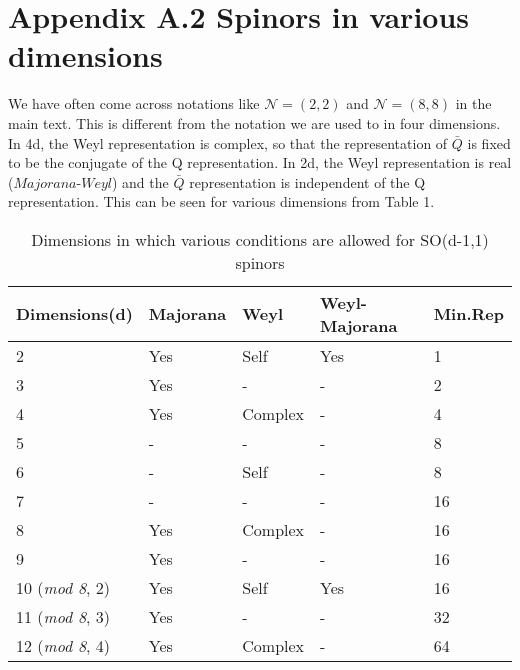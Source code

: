 \noindent \section*{\label{app:spinors} Appendix A.2 Spinors in various dimensions}


We have often come across notations like $\mathcal{N} = (2,2)$ and $\mathcal{N} = (8,8)$ in the main text. This is different from the notation we are used to in four dimensions. In 4d, the Weyl representation is complex, so that the representation of $\bar{Q}$ is fixed to be the conjugate of the Q representation. In 2d, the Weyl representation is real ($\textit{Majorana-Weyl}$) and the $\bar{Q}$ representation is independent of the Q representation. This can be seen for various dimensions from Table 1. 



\begin {table}[htbp] 
\begin{center}
\begin{tabular}{ |  p{3cm} | l | l |  l | p{3cm} |}

    \hline
    \textbf{Dimensions(d)} & \textbf{Majorana} & \textbf{Weyl} & \textbf{Weyl-Majorana}  & \textbf{Min.Rep} \\ \hline \hline 
     2 & Yes & Self & Yes & 1 \\ \hline 
     3 & Yes & - & - & 2 \\ \hline
     4 & Yes & Complex & - & 4 \\ \hline
     5 & - & - & - & 8 \\ \hline
      6 & - & Self & - & 8 \\ \hline
     7 & - & - & - & 16 \\ \hline
     8 & Yes & Complex & - & 16 \\ \hline
     9 & Yes & - & - & 16 \\ \hline
     10 (\textit{mod 8}, 2) & Yes & Self & Yes & 16 \\ \hline
     11 (\textit{mod 8}, 3) & Yes & - & - & 32 \\ \hline
     12 (\textit{mod 8}, 4) & Yes & Complex & - & 64 \\ \hline
\end{tabular}
\vspace{3mm}
\caption {Dimensions in which various conditions are allowed for SO(d-1,1) spinors} 
\end{center}
\end {table}


